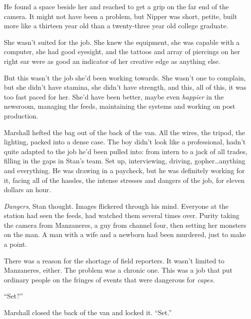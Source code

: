 He found a space beside her and reached to get a grip on the far end of the camera.  It might not have been a problem, but Nipper was short, petite, built more like a thirteen year old than a twenty-three year old college graduate.



She wasn't suited for the job.  She knew the equipment, she was capable with a computer, she had good eyesight, and the tattoos and array of piercings on her right ear were as good an indicator of her creative edge as anything else.



But this wasn't the job she'd been working towards.  She wasn't one to complain, but she didn't have stamina, she didn't have strength, and this, all of this, it was too fast paced for her.  She'd have been better, maybe even \emph{happier} in the newsroom, managing the feeds, maintaining the systems and working on post production.



Marshall hefted the bag out of the back of the van.  All the wires, the tripod, the lighting, packed into a dense case.  The boy didn't look like a professional, hadn't quite adapted to the job he'd been pulled into: from intern to a jack of all trades, filling in the gaps in Stan's team.  Set up, interviewing, driving, gopher\ldots anything and everything.  He was drawing in a paycheck, but he was definitely working for it, facing all of the hassles, the intense stresses and dangers of the job, for eleven dollars an hour.



\emph{Dangers}, Stan thought.  Images flickered through his mind.  Everyone at the station had seen the feeds, had watched them several times over.  Purity taking the camera from Manzaneres, a guy from channel four, then setting her monsters on the man.  A man with a wife and a newborn had been murdered, just to make a point.



There was a reason for the shortage of field reporters.  It wasn't limited to Manzaneres, either.  The problem was a chronic one.  This was a job that put ordinary people on the fringes of events that were dangerous for \emph{capes.}



``Set?''



Marshall closed the back of the van and locked it.  ``Set.''



